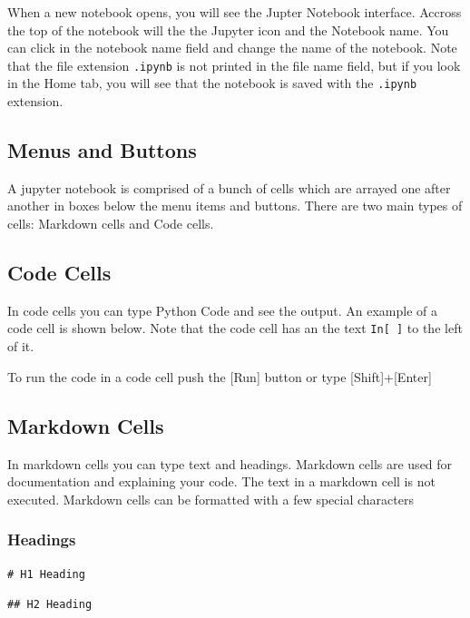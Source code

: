 \documentclass{book}
\begin{document}
When a new notebook opens, you will see the Jupter Notebook interface.
Accross the top of the notebook will the the Jupyter icon and the
Notebook name. You can click in the notebook name field and change the
name of the notebook. Note that the file extension \lstinline!.ipynb! is
not printed in the file name field, but if you look in the Home tab, you
will see that the notebook is saved with the \lstinline!.ipynb!
extension.

    \subsection{Menus and Buttons}\label{menus-and-buttons}

A jupyter notebook is comprised of a bunch of cells which are arrayed
one after another in boxes below the menu items and buttons. There are
two main types of cells: Markdown cells and Code cells.

    \subsection{Code Cells}\label{code-cells}

In code cells you can type Python Code and see the output. An example of
a code cell is shown below. Note that the code cell has an the text
\lstinline!In[ ]! to the left of it.

To run the code in a code cell push the {[}Run{]} button or type
{[}Shift{]}+{[}Enter{]}

    \subsection{Markdown Cells}\label{markdown-cells}

In markdown cells you can type text and headings. Markdown cells are
used for documentation and explaining your code. The text in a markdown
cell is not executed. Markdown cells can be formatted with a few special
characters

\subsubsection{Headings}\label{headings}

\begin{lstlisting}
# H1 Heading
\end{lstlisting}

\begin{lstlisting}
## H2 Heading
\end{lstlisting}
\end{document}
